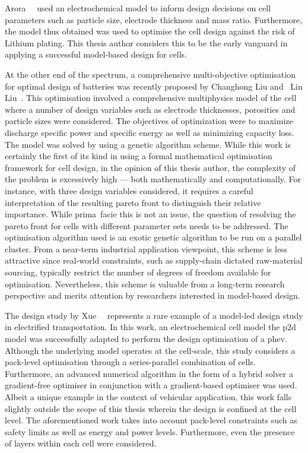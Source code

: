 Arora~\etal~\cite{Arora1999}  used an  electrochemical  model  to inform  design
decisions on cell parameters such as particle size, electrode thickness and mass
ratio. Furthermore, the model thus obtained was used to optimise the cell design
against the risk of Lithium plating. This thesis author considers this to be the
early vanguard in applying a successful model-based design for cells.

At the other  end of the spectrum, a  comprehensive multi-objective optimisation
for optimal design of batteries was  recently proposed by Changhong Liu and~ Lin
Liu~\cite{Liu2017b}.  This optimisation  involved  a comprehensive  multiphysics
model  of  the  cell where  a  number  of  design  variables such  as  electrode
thicknesses, porosities  and particle sizes  were considered. The  objectives of
optimization were  to maximize discharge  specific power and specific  energy as
well  as minimizing  capacity loss.  The  model was  solved by  using a  genetic
algorithm scheme. While this work is certainly  the first of its kind in using a
formal mathematical  optimisation framework for  cell design, in the  opinion of
this thesis author,  the complexity of the problem is  excessively high --- both
mathematically and  computationally. For  instance, with three  design variables
considered,  it  requires  a  careful interpretation  of  the  resulting  pareto
front  to  distinguish their  relative  importance.  While prima~facie  this  is
not  an  issue, the  question  of  resolving the  pareto  front  for cells  with
different parameter sets needs to  be addressed. The optimisation algorithm used
is  an  exotic genetic  algorithm  to  be run  on  a  parallel cluster.  From  a
near-term industrial application viewpoint, this scheme is less attractive since
real-world  constraints, such  as supply-chain  dictated raw-material  sourcing,
typically restrict the number of  degrees of freedom available for optimisation.
Nevertheless, this scheme is valuable  from a long-term research perspective and
merits attention by researchers interested in model-based design.

The  design study  by  Xue~\etal~\cite{Xue2013a} represents  a  rare example  of
a  model-led  design study  in  electrified  transportation.  In this  work,  an
electrochemical cell model  \viz{} the \gls{p2d} model  was successfully adapted
to  perform the  design optimisation  of a  \gls{phev}. Although  the underlying
model operates at the cell-scale, this study considers a pack-level optimisation
through  a  series-parallel  combination  of  cells.  Furthermore,  an  advanced
numerical  algorithm in  the  form  of a  hybrid  solver  \ie{} a  gradient-free
optimiser  in conjunction  with a  gradient-based optimiser  was used.  Albeit a
unique example in the context of vehicular application, this work falls slightly
outside the  scope of  this thesis wherein  the design is  confined at  the cell
level. The aforementioned work takes into account pack-level constraints such as
safety limits as well as energy and power levels. Furthermore, even the presence
of layers within each cell  were considered.


